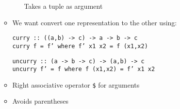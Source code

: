 \begin{itemize}
\begin{itemize}
\begin{itemize}
                     Takes a tuple as argument
                \end{itemize}
            \item We want convert one representation to the other using:
                \begin{itemize}
\begin{verbatim}
curry :: ((a,b) -> c) -> a -> b -> c
curry f = f’ where f’ x1 x2 = f (x1,x2)
\end{verbatim}
\begin{verbatim}
uncurry :: (a -> b -> c) -> (a,b) -> c
uncurry f’ = f where f (x1,x2) = f’ x1 x2
\end{verbatim}
                \end{itemize}
        \end{itemize}
        \begin{itemize}
            \item Right associative operator \verb+$+ for arguments
            \item Avoids parentheses
        \end{itemize}
\end{itemize}
